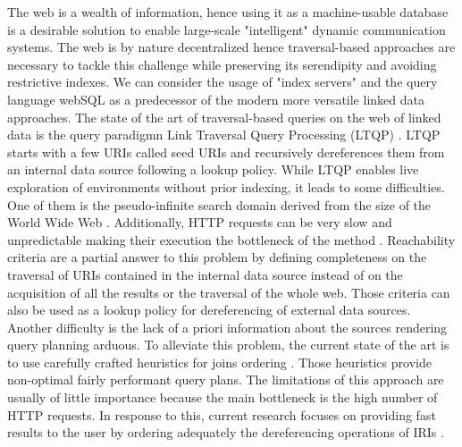 The web is a wealth of information, hence using it as a machine-usable database is a desirable solution to enable large-scale "intelligent" dynamic communication systems.
The web is by nature decentralized hence traversal-based approaches are necessary to tackle this challenge while preserving its serendipity and avoiding restrictive indexes.
We can consider the usage of "index servers" and the query language webSQL \cite{Mendelzon1996} as a predecessor of the modern more versatile linked data approaches.
The state of the art of traversal-based queries on the web of linked data is the query paradigmn Link Traversal Query Processing (LTQP) \cite{Hartig2012}.
LTQP starts with a few URIs called seed URIs and recursively dereferences them from an internal data source following a lookup policy.
While LTQP enables live exploration of environments without prior indexing, it leads to some difficulties.
One of them is the pseudo-infinite search domain derived from the size of the World Wide Web \cite{Hartig2014}.
Additionally, HTTP requests can be very slow and unpredictable making their execution the bottleneck of the method \cite{hartig2016walking}.
Reachability criteria \cite{Hartig2012} are a partial answer to this problem by defining completeness on the traversal of URIs
contained in the internal data source instead of on the acquisition of all the results or the traversal of the whole web.
Those criteria can also be used as a lookup policy for dereferencing of external data sources.
Another difficulty is the lack of a priori information about the sources rendering query planning arduous.
To alleviate this problem, the current state of the art is to use carefully crafted heuristics for joins ordering \cite{Hartig2011}.
Those heuristics provide non-optimal fairly performant query plans.
The limitations of this approach are usually of little importance because the main bottleneck is the high number of HTTP requests.
In response to this, current research focuses on providing fast results to the user by ordering adequately the dereferencing operations of IRIs \cite{hartig2016walking}.

